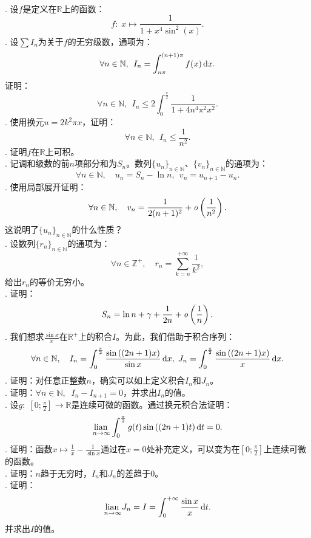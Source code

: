 \documentclass[12pt,UTF8]{ctexbook}
\begin{document}
\begin{xt}
    \mbox{} \\
    . 设$f$是定义在$\mathbb{R}$上的函数：
    $$ f: \; x\mapsto \frac{1}{1 + x^4 \sin^2{(x)}}. $$
    . 设$\sum I_n$为关于$f$的无穷级数，通项为：
    $$ \forall n\in \mathbb{N}, \; \, I_n = \int_{n\pi}^{(n+1)\pi} f(x) \,\mathrm{d}x. $$
    证明：
    $$ \forall n\in \mathbb{N}, \; \,I_n \leqslant 2 \int_{0}^{\frac{\pi}{2}} \frac{1}{1 + 4n^4\pi^2 x^2 }.  $$
    . 使用换元$u = 2k^2\pi x$，证明：
    $$ \forall n\in \mathbb{N}, \; \,I_n \leqslant \frac{1}{n^2}.  $$
    . 证明$f$在$\mathbb{R}$上可积。\\
    . 记调和级数的前$n$项部分和为$S_n$。数列$\{u_n\}_{n\in\mathbb{N}}$、$\{v_n\}_{n\in\mathbb{N}}$的通项为：
    $$ \forall n\in\mathbb{N},\quad u_n = S_n - \ln{n} ,\;\, v_n = u_{n+1} - u_n. $$
    . 使用局部展开证明：
    $$ \forall n\in\mathbb{N},\quad v_n = \frac{1}{2(n + 1)^2} + \mathit{o}\left(\frac{1}{n^2}\right). $$
    这说明了$\{u_n\}_{n\in\mathbb{N}}$的什么性质？\\
    . 设数列$\{ r_n \}_{n\in\mathbb{N}}$的通项为：
    $$ \forall n\in\mathbb{Z}^+,\quad  r_n = \sum_{k=n}^{+\infty} \frac{1}{k^2}, $$
    给出$r_n$的等价无穷小。\\
    . 证明：
    $$ S_n = \ln{n} + \gamma + \frac{1}{2n} + \mathit{o}\left(\frac{1}{n}\right). $$
    . 我们想求$\displaystyle \frac{\sin{x}}{x}$在$\mathbb{R}^+$上的积合$I$。为此，我们借助于积合序列：
    $$ \forall n\in\mathbb{N},\quad  I_n = \int_0^{\frac{\pi}{2}} \frac{\sin{((2n+1)x)}}{\sin{x}} \,\mathrm{d}x, \; J_n = \int_0^{\frac{\pi}{2}} \frac{\sin{((2n+1)x)}}{x} \,\mathrm{d}x .$$
    . 证明：对任意正整数$n$，确实可以如上定义积合$I_n$和$J_n$。\\
    . 证明：$\forall n \in\mathbb{N},\;\; I_n - I_{n+1} = 0$，并求出$I_n$的值。 \\
    . 设$g: \;\left[0;\frac{\pi}{2}\right] \rightarrow \mathbb{R}$是连续可微的函数。通过换元积合法证明：
    $$ \underset{n\to\infty}{\operatorname{lian}\,} \int_0^{\frac{\pi}{2}} g(t)\sin{((2n+1)t)} \,\mathrm{d}t = 0. $$
    . 证明：函数$\displaystyle x\mapsto \frac{1}{x} - \frac{1}{\sin{x}}$通过在$x=0$处补充定义，可以变为在$\left[0;\frac{\pi}{2}\right]$上连续可微的函数。\\
    . 证明：$n$趋于无穷时，$I_n$和$J_n$的差趋于$0$。\\
    . 证明：
    $$ \underset{n\to\infty}{\operatorname{lian}\,} J_n = I = \int_0^{+\infty} \frac{\sin{x}}{x} \,\mathrm{d}t. $$
    并求出$I$的值。
\end{xt}
\end{document}
